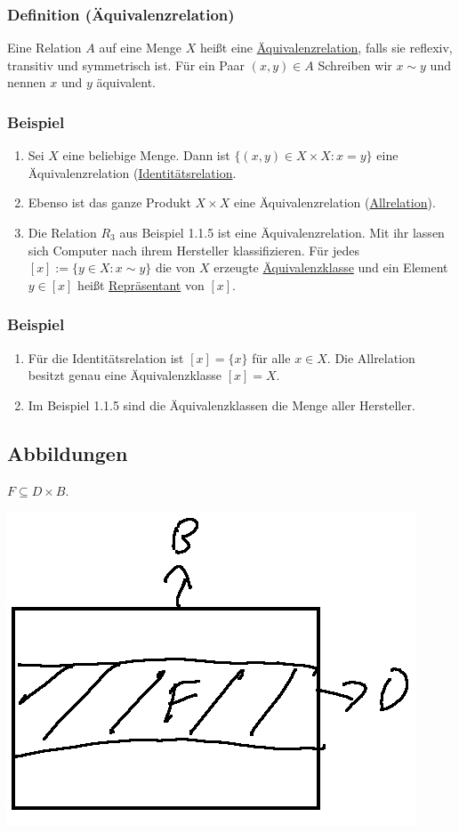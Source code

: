 \subsubsection{Definition (\"{A}quivalenzrelation)}
Eine Relation $A$ auf eine Menge $X$ heißt eine \underline{\"{A}quivalenzrelation}, falls sie reflexiv, transitiv und symmetrisch ist.  F\"{u}r ein Paar $(x,y)\in A$  Schreiben wir $x\mathtt{\sim} y$ und nennen $x$ und $y$ \"{a}quivalent.
\subsubsection{Beispiel}
\begin{enumerate}
\item Sei $X$ eine beliebige Menge.  Dann ist $\{(x,y)\in X\times X:x=y\}$ eine \"{A}quivalenzrelation (\underline{Identit\"{a}tsrelation}.
\item Ebenso ist das ganze Produkt $X\times X$ eine \"{A}quivalenzrelation (\underline{Allrelation}).
\item Die Relation $R_3$ aus Beispiel 1.1.5 ist eine \"{A}quivalenzrelation.  Mit ihr lassen sich Computer nach ihrem Hersteller klassifizieren.
F\"{u}r jedes $[x]:=\{y\in X:x \mathtt{\sim} y\}$ die von $X$ erzeugte \underline{\"{A}quivalenzklasse} und ein Element $y\in [x]$ heißt \underline{Repr\"{a}sentant} von $[x]$.
\end{enumerate}
\subsubsection{Beispiel}
\begin{enumerate}
\item F\"{u}r die Identit\"{a}tsrelation ist $[x]=\{x\}$ für alle $x\in X$.  Die Allrelation besitzt genau eine \"{A}quivalenzklasse $[x]=X$.
\item Im Beispiel 1.1.5 sind die \"{A}quivalenzklassen die Menge aller Hersteller.
\end{enumerate}

\subsection{Abbildungen}
$F\subseteq D\times B$.\\
\begin{center}
\includegraphics[scale=0.4]{1-2.jpg}
\end{center}
